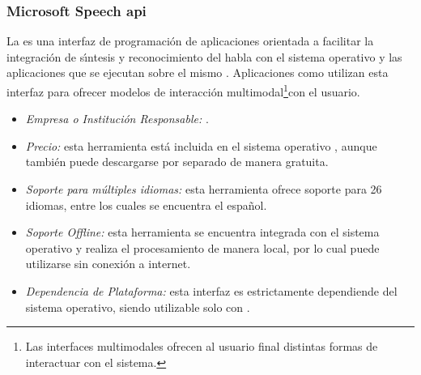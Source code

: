 \subsubsection{Microsoft Speech \gls{api}}
\label{sec:microsoft}

La  es una interfaz de programaci\'on de aplicaciones orientada a
facilitar la integraci\'on de s{\'\i}ntesis y reconocimiento del habla con el sistema operativo 
y las aplicaciones que se ejecutan sobre el mismo \cite{MicrosoftSpeech}. Aplicaciones como 
utilizan esta interfaz para ofrecer modelos de interacci\'on multimodal\footnote{Las interfaces multimodales
ofrecen al usuario final distintas formas de interactuar con el sistema.}con el usuario.

\begin{itemize}
	\item \emph{Empresa o Instituci\'on Responsable:} .
	\item \emph{Precio:} esta herramienta est\'a incluida en el sistema operativo , aunque
	tambi\'en puede descargarse por separado de manera gratuita.
	\item \emph{Soporte para m\'ultiples idiomas:} esta herramienta ofrece soporte para 26 idiomas,
	entre los cuales se encuentra el espa\~nol.
	\item \emph{Soporte Offline:} esta herramienta se encuentra integrada con el sistema operativo
	y realiza el procesamiento de manera local, por lo cual puede utilizarse sin conexi\'on a internet.
	\item \emph{Dependencia de Plataforma:} esta interfaz es estrictamente dependiende del sistema operativo,
	siendo utilizable solo con .
\end{itemize}
